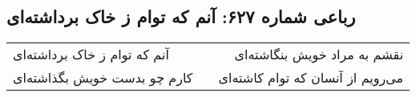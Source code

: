 \begin{center}
\section*{رباعی شماره ۶۲۷: آنم که توام ز خاک برداشته‌ای}
\label{sec:sh627}
\begin{longtable}{l p{0.5cm} r}
آنم که توام ز خاک برداشته‌ای
&&
نقشم به مراد خویش بنگاشته‌ای
\\
کارم چو بدست خویش بگذاشته‌ای
&&
می‌رویم از آنسان که توام کاشته‌ای
\\
\end{longtable}
\end{center}
